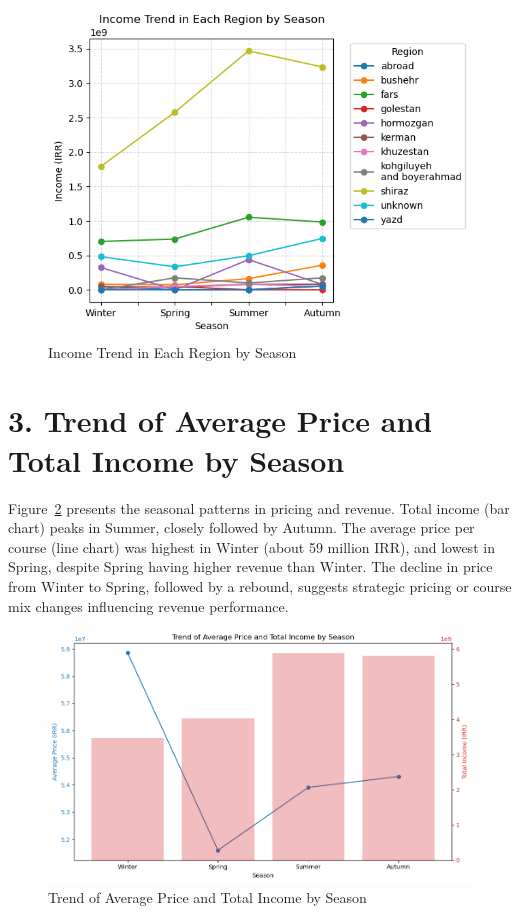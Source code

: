 \documentclass[12pt,a4paper]{article}
\begin{document}
\begin{figure}[h!]
    \centering
    \includegraphics[width=1\textwidth]{Income Trend in Each Region by Season.png}
    \caption{Income Trend in Each Region by Season}
    \label{fig:income-region-season}
\end{figure}

\section*{3. Trend of Average Price and Total Income by Season}
Figure~\ref{fig:price-income-season} presents the seasonal patterns in pricing and revenue. Total income (bar chart) peaks in Summer, closely followed by Autumn. The average price per course (line chart) was highest in Winter (about 59 million IRR), and lowest in Spring, despite Spring having higher revenue than Winter. The decline in price from Winter to Spring, followed by a rebound, suggests strategic pricing or course mix changes influencing revenue performance.

\begin{figure}[h!]
    \centering
    \includegraphics[width=1\textwidth]{Trend of Average Price and Total Income by Season.png}
    \caption{Trend of Average Price and Total Income by Season}
    \label{fig:price-income-season}
\end{figure}
\end{document}

